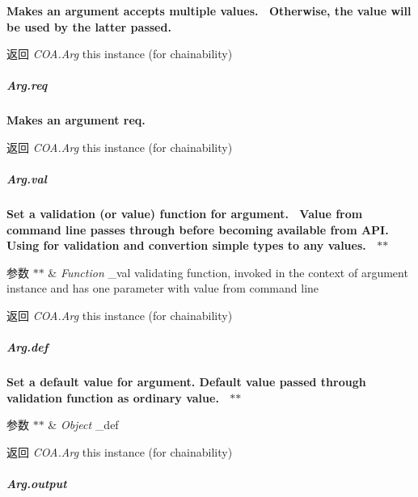 {\bfseries {\bfseries {\bfseries {\bfseries {\bfseries {\bfseries {\bfseries  Makes an argument accepts multiple values.~\newline
 Otherwise, the value will be used by the latter passed.~\newline
 {\bfseries \begin{DoxyReturn}{返回}
{\itshape C\+O\+A.\+Arg} {\ttfamily this} instance (for chainability)
\end{DoxyReturn}
\subparagraph*{Arg.\+req}}}}}}}}}

{\bfseries {\bfseries {\bfseries {\bfseries {\bfseries {\bfseries {\bfseries {\bfseries  Makes an argument req.~\newline
 {\bfseries \begin{DoxyReturn}{返回}
{\itshape C\+O\+A.\+Arg} {\ttfamily this} instance (for chainability)
\end{DoxyReturn}
\subparagraph*{Arg.\+val}}}}}}}}}}

{\bfseries {\bfseries {\bfseries {\bfseries {\bfseries {\bfseries {\bfseries {\bfseries {\bfseries  Set a validation (or value) function for argument.~\newline
 Value from command line passes through before becoming available from A\+PI.~\newline
 Using for validation and convertion simple types to any values.~\newline
 $\ast$$\ast$
\begin{DoxyParams}{参数}
{\em $\ast$$\ast$} & {\itshape Function} {\ttfamily \+\_\+val} validating function, invoked in the context of argument instance and has one parameter with value from command line~\newline
 {\bfseries }\\
\hline
\end{DoxyParams}
\begin{DoxyReturn}{返回}
{\bfseries } {\itshape C\+O\+A.\+Arg} {\ttfamily this} instance (for chainability)
\end{DoxyReturn}
\subparagraph*{Arg.\+def}}}}}}}}}}

{\bfseries {\bfseries {\bfseries {\bfseries {\bfseries {\bfseries {\bfseries {\bfseries {\bfseries  Set a default value for argument. Default value passed through validation function as ordinary value.~\newline
 $\ast$$\ast$
\begin{DoxyParams}{参数}
{\em $\ast$$\ast$} & {\itshape Object} {\ttfamily \+\_\+def}~\newline
 {\bfseries }\\
\hline
\end{DoxyParams}
\begin{DoxyReturn}{返回}
{\bfseries } {\itshape C\+O\+A.\+Arg} {\ttfamily this} instance (for chainability)
\end{DoxyReturn}
\subparagraph*{Arg.\+output}}}}}}}}}}

